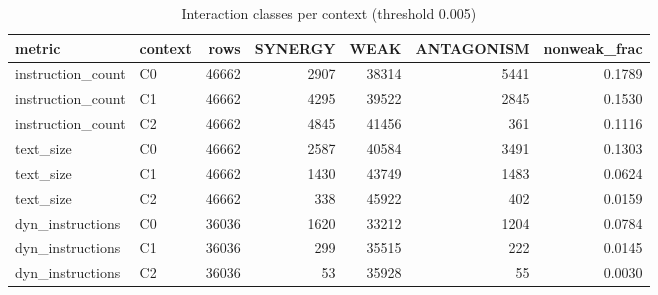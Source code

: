\begin{table}[t]
\centering
\caption{Interaction classes per context (threshold 0.005)}
\label{tab:rq1-class-distribution}
\begin{tabular}{llrrrrr}
\toprule
metric & context & rows & SYNERGY & WEAK & ANTAGONISM & nonweak\_frac \\
\midrule
instruction\_count & C0 & 46662 & 2907 & 38314 & 5441 & 0.1789 \\
instruction\_count & C1 & 46662 & 4295 & 39522 & 2845 & 0.1530 \\
instruction\_count & C2 & 46662 & 4845 & 41456 & 361 & 0.1116 \\
text\_size & C0 & 46662 & 2587 & 40584 & 3491 & 0.1303 \\
text\_size & C1 & 46662 & 1430 & 43749 & 1483 & 0.0624 \\
text\_size & C2 & 46662 & 338 & 45922 & 402 & 0.0159 \\
dyn\_instructions & C0 & 36036 & 1620 & 33212 & 1204 & 0.0784 \\
dyn\_instructions & C1 & 36036 & 299 & 35515 & 222 & 0.0145 \\
dyn\_instructions & C2 & 36036 & 53 & 35928 & 55 & 0.0030 \\
\bottomrule
\end{tabular}
\end{table}
